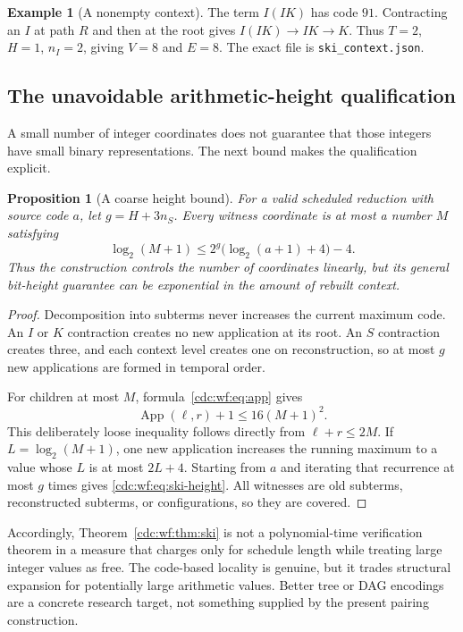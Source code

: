 \documentclass[11pt,a4paper]{article}
\newtheorem{proposition}[proposition]{Proposition}
\theoremstyle{definition}
\newtheorem{example}[example]{Example}
\theoremstyle{remark}
\newcommand{\App}{\operatorname{App}}
\begin{document}
\begin{example}[A nonempty context]
The term $I(IK)$ has code $91$. Contracting an $I$ at path $R$ and then at the root gives $I(IK)\to IK\to K$. Thus $T=2$, $H=1$, $n_I=2$, giving $V=8$ and $E=8$. The exact file is \texttt{ski\_context.json}.
\end{example}

\subsection{The unavoidable arithmetic-height qualification}
A small number of integer coordinates does not guarantee that those integers have small binary representations. The next bound makes the qualification explicit.

\begin{proposition}[A coarse height bound]\label{cdc:wf:prop:ski-height}
For a valid scheduled reduction with source code $a$, let $g=H+3n_S$. Every witness coordinate is at most a number $M$ satisfying
\begin{equation}\label{cdc:wf:eq:ski-height}
 \log_2(M+1)\leq
 2^g\bigl(\log_2(a+1)+4\bigr)-4.
\end{equation}
Thus the construction controls the number of coordinates linearly, but its general bit-height guarantee can be exponential in the amount of rebuilt context.
\end{proposition}
\begin{proof}
Decomposition into subterms never increases the current maximum code. An $I$ or $K$ contraction creates no new application at its root. An $S$ contraction creates three, and each context level creates one on reconstruction, so at most $g$ new applications are formed in temporal order.

For children at most $M$, formula~\eqref{cdc:wf:eq:app} gives
\[
 \App(\ell,r)+1\leq16(M+1)^2.
\]
This deliberately loose inequality follows directly from $\ell+r\leq2M$. If $L=\log_2(M+1)$, one new application increases the running maximum to a value whose $L$ is at most $2L+4$. Starting from $a$ and iterating that recurrence at most $g$ times gives \eqref{cdc:wf:eq:ski-height}. All witnesses are old subterms, reconstructed subterms, or configurations, so they are covered.
\end{proof}

Accordingly, Theorem~\ref{cdc:wf:thm:ski} is not a polynomial-time verification theorem in a measure that charges only for schedule length while treating large integer values as free. The code-based locality is genuine, but it trades structural expansion for potentially large arithmetic values. Better tree or DAG encodings are a concrete research target, not something supplied by the present pairing construction.
\end{document}
